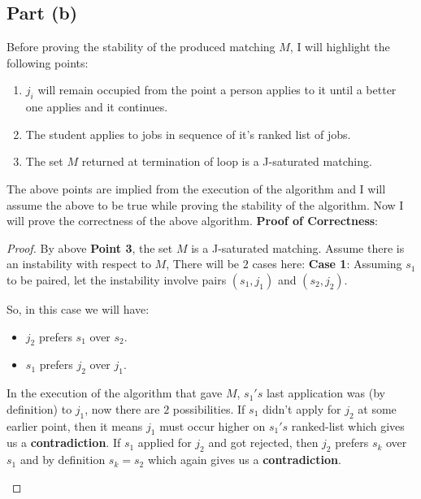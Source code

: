 \documentclass{article}
\let\bold\textbf
\newenvironment{myenv}{\begin{adjustwidth}{1cm}{}}{\end{adjustwidth}}
\begin{document}
{  \subsection{Part (b)}{
    Before proving the stability of the produced matching $M$, I will highlight the following points:
    \begin{enumerate}
      \item $j_i$ will remain occupied from the point a person applies to it until a better one applies and it continues.
      \item The student applies to jobs in sequence of it's ranked list of jobs.
      \item The set $M$ returned at termination of loop is a J-saturated matching.
    \end{enumerate}
    The above points are implied from the execution of the algorithm and I will assume the above to be true while proving the stability of the algorithm. \newline
    Now I will prove the correctness of the above algorithm. \newline
    \bold{Proof of Correctness}:
    \begin{proof}
      By above \bold{Point 3}, the set $M$ is a J-saturated matching. \newline
      Assume there is an instability with respect to $M$, There will be $2$ cases here: \newline
      \bold{Case 1}: Assuming $s_1$ to be paired, let the instability involve pairs $(s_1,j_1)$ and $(s_2,j_2)$.
      \begin{myenv}
        So, in this case we will have:
        \begin{itemize}
          \item $j_2$ prefers $s_1$ over $s_2$.
          \item $s_1$ prefers $j_2$ over $j_1$.
        \end{itemize}
        In the execution of the algorithm that gave $M$, $s_1's$ last application was (by definition) to $j_1$, now there are $2$ possibilities.\newline
        If $s_1$ didn't apply for $j_2$ at some earlier point, then it means $j_1$ must occur higher on $s_1's$ ranked-list which gives us a \bold{contradiction}. \newline
        If $s_1$ applied for $j_2$ and got rejected, then $j_2$ prefers $s_k$ over $s_1$ and by definition $s_k=s_2$ which again gives us a \bold{contradiction}.
      \end{myenv}

\end{proof}}}
\end{document}
